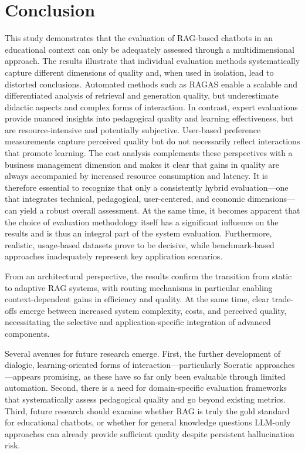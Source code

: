 \section{Conclusion}
This study demonstrates that the evaluation of RAG-based chatbots in an educational context can only be adequately assessed through a multidimensional approach. The results illustrate that individual evaluation methods systematically capture different dimensions of quality and, when used in isolation, lead to distorted conclusions. Automated methods such as RAGAS enable a scalable and differentiated analysis of retrieval and generation quality, but underestimate didactic aspects and complex forms of interaction. In contrast, expert evaluations provide nuanced insights into pedagogical quality and learning effectiveness, but are resource-intensive and potentially subjective. User-based preference measurements capture perceived quality but do not necessarily reflect interactions that promote learning. The cost analysis complements these perspectives with a business management dimension and makes it clear that gains in quality are always accompanied by increased resource consumption and latency. It is therefore essential to recognize that only a consistently hybrid evaluation—one that integrates technical, pedagogical, user-centered, and economic dimensions—can yield a robust overall assessment. At the same time, it becomes apparent that the choice of evaluation methodology itself has a significant influence on the results and is thus an integral part of the system evaluation. Furthermore, realistic, usage-based datasets prove to be decisive, while benchmark-based approaches inadequately represent key application scenarios.

From an architectural perspective, the results confirm the transition from static to adaptive RAG systems, with routing mechanisms in particular enabling context-dependent gains in efficiency and quality. At the same time, clear trade-offs emerge between increased system complexity, costs, and perceived quality, necessitating the selective and application-specific integration of advanced components.

Several avenues for future research emerge. First, the further development of dialogic, learning-oriented forms of interaction—particularly Socratic approaches—appears promising, as these have so far only been evaluable through limited automation. Second, there is a need for domain-specific evaluation frameworks that systematically assess pedagogical quality and go beyond existing metrics. Third, future research should examine whether RAG is truly the gold standard for educational chatbots, or whether for general knowledge questions LLM-only approaches can already provide sufficient quality despite persistent hallucination risk.

